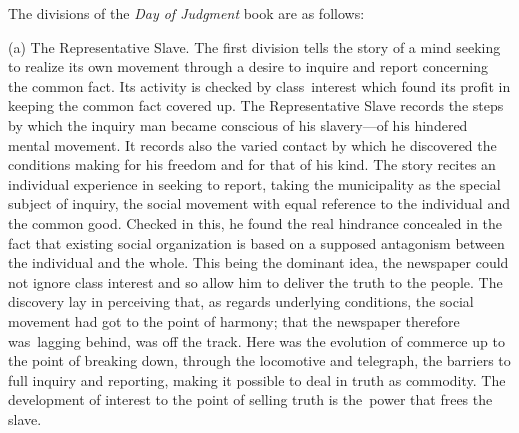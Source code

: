 \documentclass[twoside,symmetric,nobib,justified]{tufte-book}
\begin{document}
The divisions of the \emph{Day of Judgment} book are as follows:~

\vspace{.1in}

\begin{hangparas}{.25in}{1} 

(a) The Representative Slave. The first division tells the story of a
mind seeking to realize its own movement through a desire to inquire and
report concerning the common fact. Its activity is checked by
class~interest which found its profit in keeping the common fact covered
up. The Representative Slave records the steps by which the inquiry man
became conscious of his slavery---of his hindered mental movement. It
records also the varied contact by which he discovered the conditions
making for his freedom and for that of his kind. The story recites an
individual experience in seeking to report, taking the municipality as
the special subject of inquiry, the social movement with equal reference
to the individual and the common good. Checked in this, he found the
real hindrance concealed in the fact that existing social organization
is based on a supposed antagonism between the individual and the whole.
This being the dominant idea, the newspaper could not ignore class
interest and so allow him to deliver the truth to the people. The
discovery lay in perceiving that, as regards underlying conditions, the
social movement had got to the point of harmony; that the newspaper
therefore was~lagging behind, was off the track. Here was the evolution
of commerce up to the point of breaking down, through the locomotive and
telegraph, the barriers to full inquiry and reporting, making it
possible to deal in truth as commodity. The development of interest to
the point of selling truth is the~power that frees the slave.~




\end{hangparas}
\end{document}
